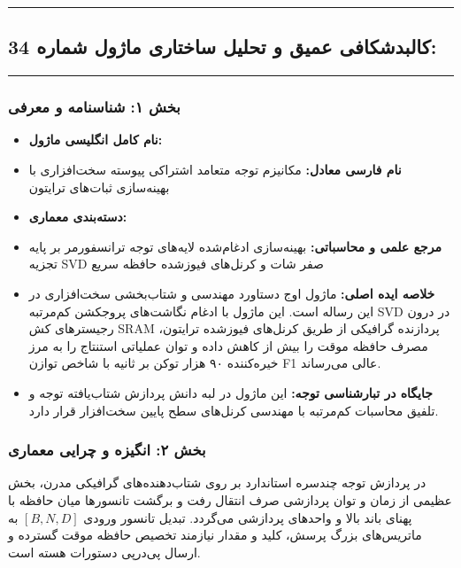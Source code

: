 \clearpage
{}
\vspace*{0.2cm}
\noindent\rule{\textwidth}{1.2pt}
\vspace*{0.1cm}
\subsection{کالبدشکافی عمیق و تحلیل ساختاری ماژول شماره 34: }
\label{sec:mod_soa_fused_module}
\vspace*{-0.2cm}
\noindent\rule{\textwidth}{0.5pt}
\vspace*{0.3cm}

\subsubsection*{بخش ۱: شناسنامه و معرفی }
\begin{itemize}
    \item \textbf{نام کامل انگلیسی ماژول:} 
    \item \textbf{نام فارسی معادل:} مکانیزم توجه متعامد اشتراکی پیوسته سخت‌افزاری با بهینه‌سازی ثبات‌های ترایتون 
    \item \textbf{دسته‌بندی معماری:} 
    \item \textbf{مرجع علمی و محاسباتی:} بهینه‌سازی ادغام‌شده لایه‌های توجه ترانسفورمر بر پایه تجزیه SVD صفر شات و کرنل‌های فیوزشده حافظه سریع 
    \item \textbf{خلاصه ایده اصلی:} ماژول  اوج دستاورد مهندسی و شتاب‌بخشی سخت‌افزاری در این رساله است. این ماژول با ادغام نگاشت‌های پروجکشن کم‌مرتبه SVD در درون رجیسترهای کش SRAM پردازنده گرافیکی از طریق کرنل‌های فیوزشده ترایتون، مصرف حافظه موقت را بیش از  کاهش داده و توان عملیاتی استنتاج را به مرز خیره‌کننده ۹۰ هزار توکن بر ثانیه با شاخص توازن F1 عالی می‌رساند.
    \item \textbf{جایگاه در تبارشناسی توجه:} این ماژول در لبه دانش پردازش شتاب‌یافته توجه و تلفیق محاسبات کم‌مرتبه با مهندسی کرنل‌های سطح پایین سخت‌افزار قرار دارد.
\end{itemize}

\subsubsection*{بخش ۲: انگیزه و چرایی معماری }
در پردازش توجه چندسره استاندارد بر روی شتاب‌دهنده‌های گرافیکی مدرن، بخش عظیمی از زمان و توان پردازشی صرف انتقال رفت و برگشت تانسورها میان حافظه با پهنای باند بالا  و واحدهای پردازشی می‌گردد. تبدیل تانسور ورودی $[B, N, D]$ به ماتریس‌های بزرگ پرسش، کلید و مقدار نیازمند تخصیص حافظه موقت گسترده و ارسال پی‌درپی دستورات هسته  است.

